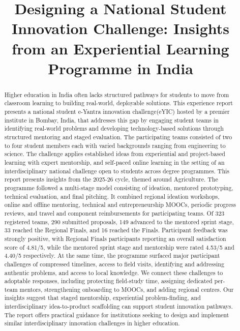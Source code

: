 \documentclass[runningheads]{llncs}
\begin{document}
\title{Designing a National Student Innovation Challenge: Insights from an Experiential Learning Programme in India}

\author{}
\institute{}

\maketitle

\begin{abstract}
Higher education in India often lacks structured pathways for students to move from classroom learning to building real-world, deployable solutions. This experience report presents a national student e-Yantra innovation challenge(eYIC) hosted by a premier institute in Bombay, India, that addresses this gap by engaging student teams in identifying real-world problems and developing technology-based solutions through structured mentoring and staged evaluation. The participating teams consisted of two to four student members each with varied backgrounds ranging from engineering to science. The challenge applies established ideas from experiential and project-based learning with expert mentorship, and self-paced online learning in the setting of an interdisciplinary national challenge open to students across degree programmes. This report presents insights from the 2025-26 cycle, themed around Agriculture. The programme followed a multi-stage model consisting of ideation, mentored prototyping, technical evaluation, and final pitching. It combined regional ideation workshops, online and offline mentoring, technical and entrepreneurship MOOCs, periodic progress reviews, and travel and component reimbursements for participating teams. Of 323 registered teams, 290 submitted proposals, 149 advanced to the mentored sprint stage, 33 reached the Regional Finals, and 16 reached the Finals. Participant feedback was strongly positive, with Regional Finals participants reporting an overall satisfaction score of 4.81/5, while the mentored sprint stage and mentorship were rated 4.53/5 and 4.40/5 respectively. At the same time, the programme surfaced major participant challenges of compressed timelines, access to field visits, identifying and addressing authentic problems, and access to local knowledge. We connect these challenges to adoptable responses, including protecting field-study time, assigning dedicated per-team mentors, strengthening onboarding to MOOCs, and adding regional centres. Our insights suggest that staged mentorship, experiential problem-finding, and interdisciplinary idea-to-product scaffolding can support student innovation pathways. The report offers practical guidance for institutions seeking to design and implement similar interdisciplinary innovation challenges in higher education.


\end{abstract}
\end{document}
